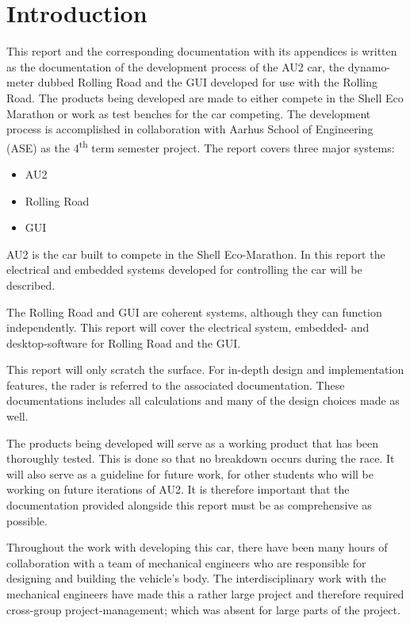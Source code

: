 \chapter{Introduction}
This report and the corresponding documentation with its appendices is written as the documentation of the development process of the AU2 car, the dynamo-meter dubbed Rolling Road and the GUI developed for use with the Rolling Road. The products being developed are made to either compete in the Shell Eco Marathon or work as test benches for the car competing. The development process is accomplished in collaboration with Aarhus School of Engineering (ASE) as the 4\textsuperscript{th} term semester project. The report covers three major systems:

\begin{itemize}
	\item{AU2}
	\item{Rolling Road}
	\item{GUI}
\end{itemize}

AU2 is the car built to compete in the Shell Eco-Marathon. In this report the electrical and embedded systems developed for controlling the car will be described. 

The Rolling Road and GUI are coherent systems, although they can function independently. This report will cover the electrical system, embedded- and desktop-software for Rolling Road and the GUI. 

This report will only scratch the surface. For in-depth design and implementation features, the rader is referred to the associated documentation. These documentations includes all calculations and many of the design choices made as well.  

The products being developed will serve as a working product that has been thoroughly tested. This is done so that no breakdown occurs during the race. It will also serve as a guideline for future work, for other students who will be working on future iterations of AU2. It is therefore important that the documentation provided alongside this report must be as comprehensive as possible.

Throughout the work with developing this car, there have been many hours of collaboration with a team of mechanical engineers who are responsible for designing and building the vehicle's body. The interdisciplinary work with the mechanical engineers have made this a rather large project and therefore required cross-group project-management; which was absent for large parts of the project. 

